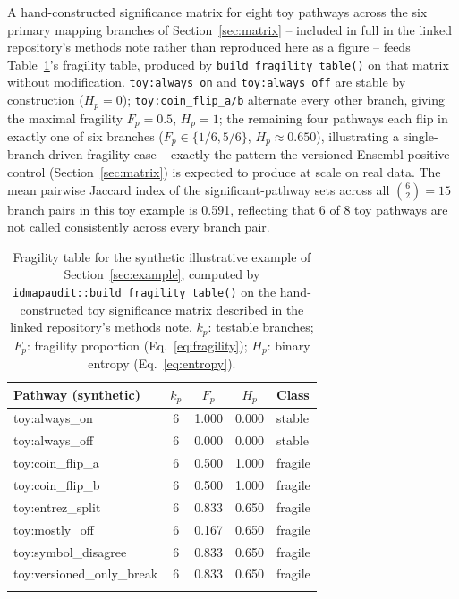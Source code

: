 \documentclass[webpdf,contemporary,large]{oup-authoring-template}
\theoremstyle{thmstyleone}%
\theoremstyle{thmstyletwo}%
\theoremstyle{thmstylethree}%
\begin{document}
A hand-constructed significance matrix for eight toy pathways across the six primary mapping branches of Section~\ref{sec:matrix} -- included in full in the linked repository's methods note rather than reproduced here as a figure -- feeds Table~\ref{tab:toy}'s fragility table, produced by \texttt{build\_fragility\_table()} on that matrix without modification. \texttt{toy:always\_on} and \texttt{toy:always\_off} are stable by construction ($H_p=0$); \texttt{toy:coin\_flip\_a/b} alternate every other branch, giving the maximal fragility $F_p=0.5$, $H_p=1$; the remaining four pathways each flip in exactly one of six branches ($F_p\in\{1/6,5/6\}$, $H_p\approx0.650$), illustrating a single-branch-driven fragility case -- exactly the pattern the versioned-Ensembl positive control (Section~\ref{sec:matrix}) is expected to produce at scale on real data. The mean pairwise Jaccard index of the significant-pathway sets across all $\binom{6}{2}=15$ branch pairs in this toy example is 0.591, reflecting that 6 of 8 toy pathways are not called consistently across every branch pair.

\begin{table}[!t]
\caption{Fragility table for the synthetic illustrative example of Section~\ref{sec:example}, computed by \texttt{idmapaudit::build\_fragility\_table()} on the hand-constructed toy significance matrix described in the linked repository's methods note. $k_p$: testable branches; $F_p$: fragility proportion (Eq.~\ref{eq:fragility}); $H_p$: binary entropy (Eq.~\ref{eq:entropy}).\label{tab:toy}}
\begin{tabular*}{\columnwidth}{@{\extracolsep\fill}lcccl@{\extracolsep\fill}}
\toprule
Pathway (synthetic) & $k_p$ & $F_p$ & $H_p$ & Class \\
\midrule
toy:always\_on           & 6 & 1.000 & 0.000 & stable \\
toy:always\_off          & 6 & 0.000 & 0.000 & stable \\
toy:coin\_flip\_a        & 6 & 0.500 & 1.000 & fragile \\
toy:coin\_flip\_b        & 6 & 0.500 & 1.000 & fragile \\
toy:entrez\_split        & 6 & 0.833 & 0.650 & fragile \\
toy:mostly\_off          & 6 & 0.167 & 0.650 & fragile \\
toy:symbol\_disagree     & 6 & 0.833 & 0.650 & fragile \\
toy:versioned\_only\_break & 6 & 0.833 & 0.650 & fragile \\
\botrule
\end{tabular*}
\end{table}
\end{document}
